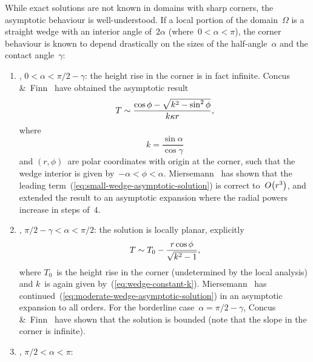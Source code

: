 While exact solutions are not known in domains with sharp corners,
the asymptotic behaviour is well-understood.
If a local portion of the domain~$\Omega$
is a straight wedge with an interior angle of~$2 \alpha$
(where~$0 < \alpha < \pi$),
the corner behaviour is known to depend drastically
on the sizes of the half-angle~$\alpha$ and the contact angle~$\gamma$:
\begin{enumerate}
  \item
    , $0 < \alpha < \pi/2 - \gamma$:
    the height rise in the corner is in fact infinite.
    Concus \&~Finn~\cite{concus-1970-class-capillary-surfaces}
    have obtained the asymptotic result
    \begin{equation}
      T \sim \frac{\cos\phi - \sqrt{k^2 - \sin^2 \phi}}{k \kappa r},
      \label{eq:small-wedge-asymptotic-solution}
    \end{equation}
    where
    \begin{equation}
      k = \frac{\sin\alpha}{\cos\gamma}
      \label{eq:wedge-constant-k}
    \end{equation}
    and $(r, \phi)$~are polar coordinates with origin at the corner,
    such that the wedge interior is given by~$-\alpha < \phi < \alpha$.
    Miersemann~\cite{miersemann-1993-asymptotic-corner-capillary-singular}
    has shown that the leading term~(\ref{eq:small-wedge-asymptotic-solution})
    is correct to~$\order \roundbr*{r^3}$,
    and extended the result to an asymptotic expansion
    where the radial powers increase in steps of~$4$.
  \item
    , $\pi/2 - \gamma < \alpha < \pi/2$:
    the solution is locally planar,
    explicitly
    \begin{equation}
      T \sim T_0 - \frac{r \cos\phi}{\sqrt{k^2 - 1}},
      \label{eq:moderate-wedge-asymptotic-solution}
    \end{equation}
    where $T_0$~is the height rise in the corner
    (undetermined by the local analysis)
    and $k$~is again given by~(\ref{eq:wedge-constant-k}).
    Miersemann~\cite{miersemann-1988-asymptotic-expansion-corner-capillary}
    has continued~(\ref{eq:moderate-wedge-asymptotic-solution})
    in an asymptotic expansion to all orders.
    For the borderline case~$\alpha = \pi/2 - \gamma$,
    Concus \&~Finn~\cite{concus-1969-behavior-capillary-surface-wedge}
    have shown that the solution is bounded
    (note that the slope in the corner is infinite).
  \item
    , $\pi/2 < \alpha < \pi$:

\end{enumerate}
